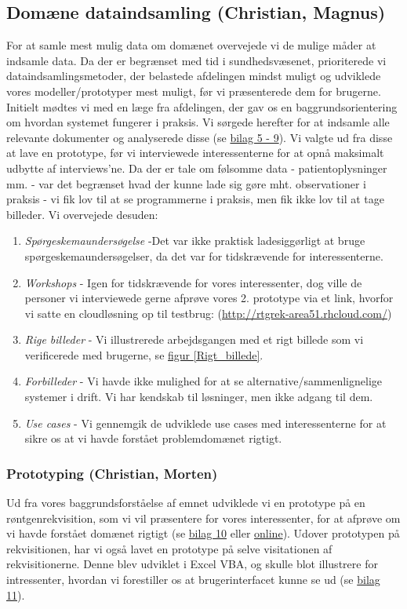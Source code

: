 \subsection*{Domæne dataindsamling (Christian, Magnus)}
For at samle mest mulig data om domænet overvejede vi de mulige måder at
indsamle data. Da der er begrænset med tid i sundhedsvæsenet, prioriterede vi
dataindsamlingsmetoder, der belastede afdelingen mindst muligt og udviklede
vores modeller/prototyper mest muligt, før vi præsenterede dem for brugerne.\\
\indent Initielt mødtes vi med en læge fra afdelingen, der gav os en
baggrundsorientering om hvordan systemet fungerer i praksis. Vi sørgede herefter
for at indsamle alle relevante dokumenter og analyserede disse (se
\hyperref[Bilag5]{bilag 5 - 9}). Vi valgte ud fra disse at lave en prototype,
før vi interviewede interessenterne for at opnå maksimalt udbytte af
interviews'ne. Da der er tale om følsomme data - patientoplysninger mm. - var
det begrænset hvad der kunne lade sig gøre mht. observationer i praksis - vi fik
lov til at se programmerne i praksis, men fik ikke lov til at tage billeder. Vi
overvejede desuden:\\
\begin{enumerate}
  \item \emph{Spørgeskemaundersøgelse} -Det var ikke praktisk ladesiggørligt at
  bruge spørgeskemaundersøgelser, da det var for tidskrævende for
  interessenterne.
  \item \emph{Workshops} - Igen for tidskrævende for vores interessenter, dog
  ville de personer vi interviewede gerne afprøve vores 2. prototype via et
  link, hvorfor vi satte en cloudløsning op til testbrug:
  (\url{http://rtgrek-area51.rhcloud.com/})
  \item \emph{Rige billeder} - Vi illustrerede arbejdsgangen med et rigt billede
  som vi verificerede med brugerne, se \hyperref[Rigt_billede]{figur \ref*{Rigt_billede}}.
  \item \emph{Forbilleder} - Vi havde ikke mulighed for at se
  alternative/sammenlignelige systemer i drift. Vi har kendskab til løsninger,
  men ikke adgang til dem.
  \item \emph{Use cases} - Vi gennemgik de udviklede use cases med
  interessenterne for at sikre os at vi havde forstået problemdomænet rigtigt.
\end{enumerate}
\subsubsection*{Prototyping (Christian, Morten)}
Ud fra vores baggrundsforståelse af emnet udviklede vi en prototype på en
røntgenrekvisition, som vi vil præsentere for vores interessenter, for at
afprøve om vi havde forstået domænet rigtigt (se \hyperref[Bilag10]{bilag
10} eller
\href{https://docs.google.com/forms/d/1mb5n0rR4vUuns_TXM7ai3vY1BZxPrvxd8P4NFjs5igw/viewform}{online}).
\indent Udover prototypen på rekvisitionen, har vi også lavet en prototype på
selve visitationen af rekvisitionerne. Denne blev udviklet i Excel VBA, og
skulle blot illustrere for intressenter, hvordan vi forestiller os at
brugerinterfacet kunne se ud (se \hyperref[Bilag11]{bilag 11}).
